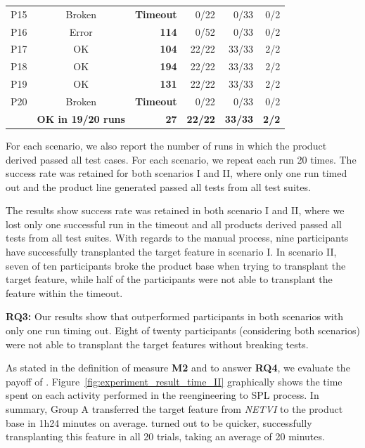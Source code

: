 \begin{table}[t]
\begin{tabular}{lcrrrr}
		 P15 &Broken  &\multicolumn{1}{c}{\textbf{Timeout}}  & 0/22 & 0/33 & 0/2\\
		 P16 &Error    &\textbf{114} & 0/52 & 0/33 & 0/2\\
		 P17 &OK       &\cellcolor[gray]{.9}\textbf{104} & 22/22 & 33/33 & 2/2\\
		 P18 &OK       &\textbf{194} & 22/22 & 33/33 & 2/2\\
		 P19 &OK       &\textbf{131} & 22/22 & 33/33 & 2/2\\
		 P20 &Broken & \multicolumn{1}{c}{\textbf{Timeout}} & 0/22 & 0/33 & 0/2\\
		 \hline 
		 \rowcolor[gray]{.9} \textbf{\prodscalpel} &\textbf{OK in 19/20 runs} &\textbf{27} & \textbf{22/22} &\textbf{33/33}  &\textbf{2/2} \\\hline
	\end{tabular}
\end{table}

For each scenario, we also report the number of \prodscalpel runs in which the product derived passed all test cases. For each scenario, we repeat each run 20 times. The success rate was retained for both scenarios I and II, where only one run timed out and the product line generated passed all tests from all test suites.

The results show success rate was retained in both scenario I and II, where we lost only one successful run in the timeout and all products derived passed all tests from all test suites.  
With regards to the manual process, nine participants have successfully transplanted the target feature in scenario I. 
In scenario II, seven of ten participants broke the product base when trying to transplant the target feature, while half of the participants were not able to transplant the feature within the timeout.

\begin{framed}
\noindent \textbf{RQ3:} Our results show that \prodscalpel outperformed participants in both scenarios with only one run timing out.  
Eight of twenty participants (considering both scenarios) were not able to transplant the target features without breaking tests.
\end{framed}

As stated in the definition of measure \textbf{M2} and to answer \textbf{RQ4}, we evaluate the payoff of \prodscalpel. Figure~\ref{fig:experiment_result_time_II} graphically shows the time spent on each activity performed in the reengineering to SPL process. In summary, Group A transferred the target feature from \emph{NETVI} to the product base in 1h24 minutes on average. \prodscalpel turned out to be quicker, successfully transplanting this feature in all 20 trials, taking an average of 20 minutes.

